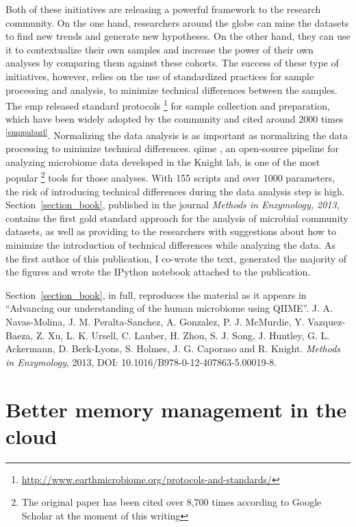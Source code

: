 \documentclass[12pt,chapterheads]{ucsd}
\begin{document}
Both of these initiatives are releasing a powerful framework to the research
community. On the one hand, researchers around the globe can mine the datasets to
find new trends and generate new hypotheses. On the other hand, they can use
it to contextualize their own samples and increase the power of their own analyses
by comparing them against these cohorts. The success of these type of initiatives,
however, relies on the use of standardized practices for sample processing and
analysis, to minimize technical differences between the samples. The \gls{emp}
released standard protocols \footnote{ \url{http://www.earthmicrobiome.org/protocols-and-standards/}}
for sample collection and preparation, which have been widely adopted by the community and cited
around 2000 times \textsuperscript{\ref{emppuburl}}. Normalizing the data
analysis is as important as normalizing the data processing to minimize
technical differences. \gls{qiime} \cite{Caporaso2010}, an open-source pipeline for analyzing microbiome
data developed in the Knight lab, is one of the most popular \footnote{The original paper
has been cited over 8,700 times according to Google Scholar at the moment of this writing}
tools for those analyses. With 155 scripts and over 1000
parameters, the risk of introducing technical differences during the data analysis
step is high. Section~\ref{section_book}, published in the journal
\textsl{Methods in Enzymology, 2013}, contains the first gold standard approach
for the analysis of microbial community datasets, as well as providing to the
researchers with suggestions about how to minimize the introduction of
technical differences while analyzing the data. As the first author of this
publication, I co-wrote the text, generated the majority of the figures and wrote
the IPython notebook \cite{Perez2007} attached to the publication.

Section~\ref{section_book}, in full, reproduces the material as it
appears in ``Advancing our understanding of the human microbiome using QIIME''.
J. A. Navas-Molina, J. M. Peralta-Sanchez, A. Gonzalez, P. J. McMurdie,
Y. Vazquez-Baeza, Z. Xu, L. K. Ursell, C. Lauber, H. Zhou, S. J. Song,
J. Huntley, G. L. Ackermann, D. Berk-Lyons, S. Holmes, J. G. Caporaso and R.
Knight. \emph{Methods in Enzymology}, 2013, DOI: 10.1016/B978-0-12-407863-5.00019-8.





\chapter{Better memory management in the cloud}\label{chapter_cudswap}
\glsresetall
\end{document}

